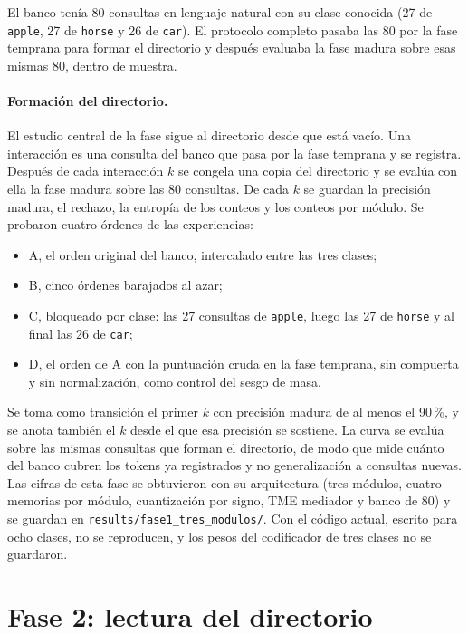El banco tenía 80 consultas en lenguaje natural con su clase conocida (27 de
\texttt{apple}, 27 de \texttt{horse} y 26 de \texttt{car}).
El protocolo completo pasaba las 80 por la fase temprana para formar el directorio y
después evaluaba la fase madura sobre esas mismas 80, dentro de muestra.

\paragraph{Formación del directorio.}
El estudio central de la fase sigue al directorio desde que está vacío.
Una interacción es una consulta del banco que pasa por la fase temprana y se registra.
Después de cada interacción $k$ se congela una copia del directorio y se evalúa con ella
la fase madura sobre las 80 consultas.
De cada $k$ se guardan la precisión madura, el rechazo, la entropía de los conteos y los
conteos por módulo.
Se probaron cuatro órdenes de las experiencias:
\begin{itemize}
    \item A, el orden original del banco, intercalado entre las tres clases;
    \item B, cinco órdenes barajados al azar;
    \item C, bloqueado por clase: las 27 consultas de \texttt{apple}, luego las 27 de
    \texttt{horse} y al final las 26 de \texttt{car};
    \item D, el orden de A con la puntuación cruda en la fase temprana, sin compuerta y
    sin normalización, como control del sesgo de masa.
\end{itemize}
Se toma como transición el primer $k$ con precisión madura de al menos el 90\,\%, y se
anota también el $k$ desde el que esa precisión se sostiene.
La curva se evalúa sobre las mismas consultas que forman el directorio, de modo que mide
cuánto del banco cubren los tokens ya registrados y no generalización a consultas
nuevas.
Las cifras de esta fase se obtuvieron con su arquitectura (tres módulos, cuatro memorias
por módulo, cuantización por signo, TME mediador y banco de 80) y se guardan en
\texttt{results/fase1\_tres\_modulos/}.
Con el código actual, escrito para ocho clases, no se reproducen, y los pesos del
codificador de tres clases no se guardaron.

\section{Fase 2: lectura del directorio}
\label{fase2:lectura}

